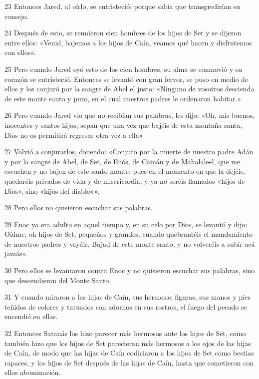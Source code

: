 \par 23 Entonces Jared, al oírlo, se entristeció; porque sabía que transgredirían su consejo.

\par 24 Después de esto, se reunieron cien hombres de los hijos de Set y se dijeron entre ellos: «Venid, bajemos a los hijos de Caín, veamos qué hacen y disfrutemos con ellos».

\par 25 Pero cuando Jared oyó esto de los cien hombres, su alma se conmovió y su corazón se entristeció. Entonces se levantó con gran fervor, se puso en medio de ellos y los conjuró por la sangre de Abel el justo: «Ninguno de vosotros descienda de este monte santo y puro, en el cual nuestros padres le ordenaron habitar.»

\par 26 Pero cuando Jared vio que no recibían sus palabras, les dijo: «Oh, mis buenos, inocentes y santos hijos, sepan que una vez que bajéis de esta montaña santa, Dios no os permitirá regresar otra vez a ella»

\par 27 Volvió a conjurarlos, diciendo: «Conjuro por la muerte de nuestro padre Adán y por la sangre de Abel, de Set, de Enós, de Cainán y de Mahalaleel, que me escuchen y no bajen de este santo monte; pues en el momento en que la dejéis, quedaréis privados de vida y de misericordia; y ya no seréis llamados «hijos de Dios», sino «hijos del diablo»».

\par 28 Pero ellos no quisieron escuchar sus palabras.

\par 29 Enoc ya era adulto en aquel tiempo y, en su celo por Dios, se levantó y dijo: Oídme, oh hijos de Set, pequeños y grandes, cuando quebrantéis el mandamiento de nuestros padres y vayáis. Bajad de este monte santo, y no volveréis a subir acá jamás».

\par 30 Pero ellos se levantaron contra Enoc y no quisieron escuchar sus palabras, sino que descendieron del Monte Santo.

\par 31 Y cuando miraron a las hijas de Caín, sus hermosas figuras, sus manos y pies teñidos de colores y tatuados con adornos en sus rostros, el fuego del pecado se encendió en ellas.

\par 32 Entonces Satanás los hizo parecer más hermosos ante los hijos de Set, como también hizo que los hijos de Set parecieran más hermosos a los ojos de las hijas de Caín, de modo que las hijas de Caín codiciaron a los hijos de Set como bestias rapaces, y los hijos de Set después de las hijas de Caín, hasta que cometieron con ellos abominación.

